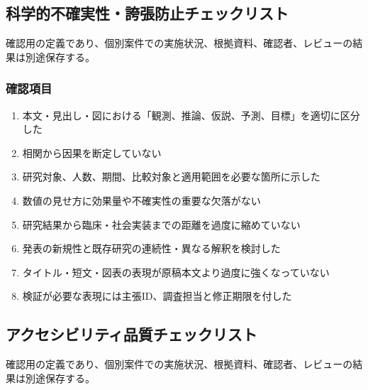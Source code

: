 \documentclass[a4paper,11pt]{article}
\begin{document}
\subsection{科学的不確実性・誇張防止チェックリスト}
\par 確認用の定義であり、個別案件での実施状況、根拠資料、確認者、レビューの結果は別途保存する。\par\medskip
\subsubsection*{確認項目}
\begin{enumerate}[leftmargin=2em,itemsep=0.3em]
\item 本文・見出し・図における「観測、推論、仮説、予測、目標」を適切に区分した\par
\item 相関から因果を断定していない\par
\item 研究対象、人数、期間、比較対象と適用範囲を必要な箇所に示した\par
\item 数値の見せ方に効果量や不確実性の重要な欠落がない\par
\item 研究結果から臨床・社会実装までの距離を過度に縮めていない\par
\item 発表の新規性と既存研究の連続性・異なる解釈を検討した\par
\item タイトル・短文・図表の表現が原稿本文より過度に強くなっていない\par
\item 検証が必要な表現には主張ID、調査担当と修正期限を付した\par
\end{enumerate}
\subsection{アクセシビリティ品質チェックリスト}
\par 確認用の定義であり、個別案件での実施状況、根拠資料、確認者、レビューの結果は別途保存する。\par\medskip
\end{document}

